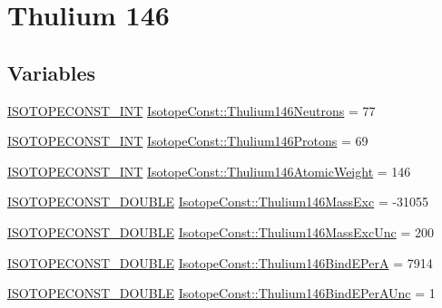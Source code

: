 \hypertarget{group___isotope_const-_thulium-_tm146}{}\section{Thulium 146}
\label{group___isotope_const-_thulium-_tm146}
\subsection*{Variables}
\begin{DoxyCompactItemize}
\item 
\mbox{\hyperlink{group___isotope_const-_macros_ga5f18360b3e99483a35c32d789e62621c}{I\+S\+O\+T\+O\+P\+E\+C\+O\+N\+S\+T\+\_\+\+I\+NT}} \mbox{\hyperlink{group___isotope_const-_thulium-_tm146_gac6fc4695076f5225be69d0a8f3e4bdee}{Isotope\+Const\+::\+Thulium146\+Neutrons}} = 77
\item 
\mbox{\hyperlink{group___isotope_const-_macros_ga5f18360b3e99483a35c32d789e62621c}{I\+S\+O\+T\+O\+P\+E\+C\+O\+N\+S\+T\+\_\+\+I\+NT}} \mbox{\hyperlink{group___isotope_const-_thulium-_tm146_ga748d540ae227454e1adff7b1fce7e66f}{Isotope\+Const\+::\+Thulium146\+Protons}} = 69
\item 
\mbox{\hyperlink{group___isotope_const-_macros_ga5f18360b3e99483a35c32d789e62621c}{I\+S\+O\+T\+O\+P\+E\+C\+O\+N\+S\+T\+\_\+\+I\+NT}} \mbox{\hyperlink{group___isotope_const-_thulium-_tm146_gaa2578d1b8b3dc8127ddcd6b764ef05e0}{Isotope\+Const\+::\+Thulium146\+Atomic\+Weight}} = 146
\item 
\mbox{\hyperlink{group___isotope_const-_macros_ga8f45a7272ce02c0b4c65c44636ed719a}{I\+S\+O\+T\+O\+P\+E\+C\+O\+N\+S\+T\+\_\+\+D\+O\+U\+B\+LE}} \mbox{\hyperlink{group___isotope_const-_thulium-_tm146_ga506451444ec185ead3cec387ee123927}{Isotope\+Const\+::\+Thulium146\+Mass\+Exc}} = -\/31055
\item 
\mbox{\hyperlink{group___isotope_const-_macros_ga8f45a7272ce02c0b4c65c44636ed719a}{I\+S\+O\+T\+O\+P\+E\+C\+O\+N\+S\+T\+\_\+\+D\+O\+U\+B\+LE}} \mbox{\hyperlink{group___isotope_const-_thulium-_tm146_gaaa94e9472a33894624d9fe4f1e47a3f6}{Isotope\+Const\+::\+Thulium146\+Mass\+Exc\+Unc}} = 200
\item 
\mbox{\hyperlink{group___isotope_const-_macros_ga8f45a7272ce02c0b4c65c44636ed719a}{I\+S\+O\+T\+O\+P\+E\+C\+O\+N\+S\+T\+\_\+\+D\+O\+U\+B\+LE}} \mbox{\hyperlink{group___isotope_const-_thulium-_tm146_ga3c63cbcc9f6baac5f2202ec374e8b158}{Isotope\+Const\+::\+Thulium146\+Bind\+E\+PerA}} = 7914
\item 
\mbox{\hyperlink{group___isotope_const-_macros_ga8f45a7272ce02c0b4c65c44636ed719a}{I\+S\+O\+T\+O\+P\+E\+C\+O\+N\+S\+T\+\_\+\+D\+O\+U\+B\+LE}} \mbox{\hyperlink{group___isotope_const-_thulium-_tm146_ga885913b8aa37e52e4080fbaff78c18d4}{Isotope\+Const\+::\+Thulium146\+Bind\+E\+Per\+A\+Unc}} = 1

\end{DoxyCompactItemize}
